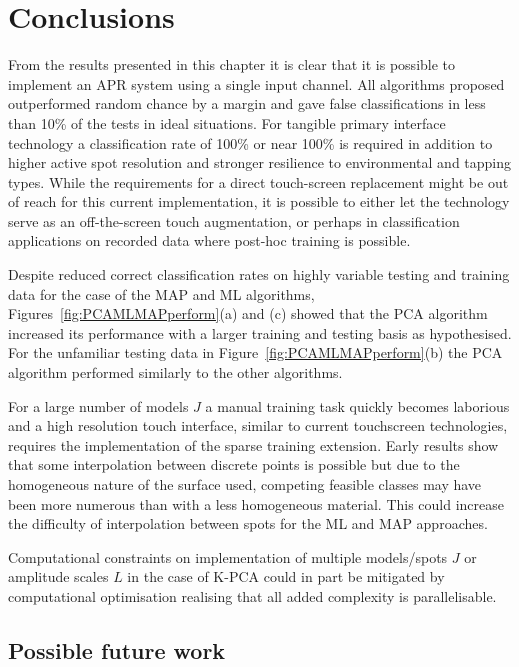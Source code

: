 \section{Conclusions}
From the results presented in this chapter it is clear that it is possible to implement an APR system using a single input channel. All algorithms proposed outperformed random chance by a margin and gave false classifications in less than 10\% of the tests in ideal situations. For tangible primary interface technology a classification rate of 100\% or near 100\% is required in addition to higher active spot resolution and stronger resilience to environmental and tapping types. While the requirements for a direct touch-screen replacement might be out of reach for this current implementation, it is possible to either let the technology serve as an off-the-screen touch augmentation, or perhaps in classification applications on recorded data where post-hoc training is possible.

Despite reduced correct classification rates on highly variable testing and training data for the case of the MAP and ML algorithms, Figures~\ref{fig:PCAMLMAPperform}(a) and (c) showed that the PCA algorithm increased its performance with a larger training and testing basis as hypothesised. For the unfamiliar testing data in Figure~\ref{fig:PCAMLMAPperform}(b) the PCA algorithm performed similarly to the other algorithms.

For a large number of models $J$ a manual training task quickly becomes laborious and a high resolution touch interface, similar to current touchscreen technologies, requires the implementation of the sparse training extension. Early results show that some interpolation between discrete points is possible but due to the homogeneous nature of the surface used, competing feasible classes may have been more numerous than with a less homogeneous material. This could increase the difficulty of interpolation between spots for the ML and MAP approaches.

Computational constraints on implementation of multiple models/spots $J$ or amplitude scales $L$ in the case of K-PCA could in part be mitigated by computational optimisation realising that all added complexity is parallelisable.

\subsection{Possible future work}
